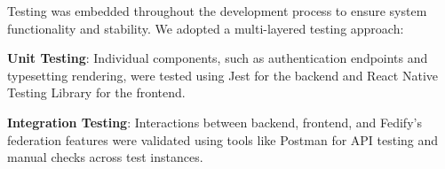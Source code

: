 Testing was embedded throughout the development process to ensure system functionality and stability. We adopted a multi-layered testing approach:

\textbf{Unit Testing}: Individual components, such as authentication endpoints and typesetting rendering, were tested using Jest for the backend and React Native Testing Library for the frontend.

\textbf{Integration Testing}: Interactions between backend, frontend, and Fedify’s federation features were validated using tools like Postman for API testing and manual checks across test instances.

